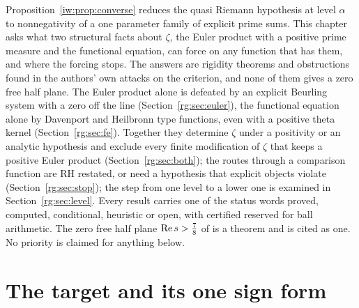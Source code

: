 
Proposition~\ref{iw:prop:converse} reduces the quasi Riemann hypothesis at level $\alpha$ to nonnegativity of a one parameter family of explicit prime sums. This chapter asks what two structural facts about $\zeta$, the Euler product with a positive prime measure and the functional equation, can force on any function that has them, and where the forcing stops. The answers are rigidity theorems and obstructions found in the authors' own attacks on the criterion, and none of them gives a zero free half plane. The Euler product alone is defeated by an explicit Beurling system with a zero off the line (Section~\ref{rg:sec:euler}), the functional equation alone by Davenport and Heilbronn type functions, even with a positive theta kernel (Section~\ref{rg:sec:fe}). Together they determine $\zeta$ under a positivity or an analytic hypothesis and exclude every finite modification of $\zeta$ that keeps a positive Euler product (Section~\ref{rg:sec:both}); the routes through a comparison function are RH restated, or need a hypothesis that explicit objects violate (Section~\ref{rg:sec:stop}); the step from one level to a lower one is examined in Section~\ref{rg:sec:level}. Every result carries one of the status words proved, computed, conditional, heuristic or open, with certified reserved for ball arithmetic. The zero free half plane $\operatorname{Re} s>\frac78$ of \cite{OAI26a} is a theorem and is cited as one. No priority is claimed for anything below.

\section{The target and its one sign form}\label{rg:sec:target}

